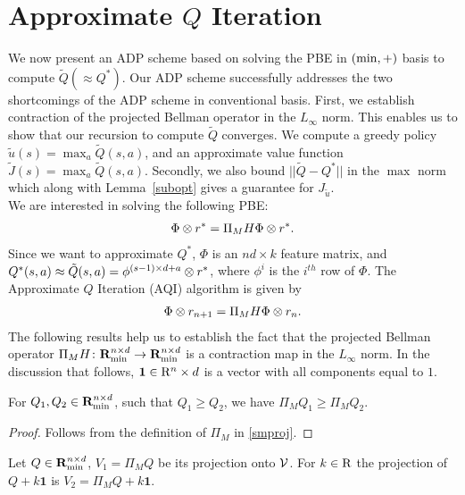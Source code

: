 \section{ Approximate $Q$ Iteration}\label{adpminp}
We now present an ADP scheme based on solving the PBE in $(\min,+)$ basis to compute $\tilde{Q}(\approx Q^*)$. Our ADP scheme successfully addresses the two shortcomings of the ADP scheme in conventional basis. First, we establish contraction of the projected Bellman operator in the $L_\infty$ norm. This enables us to show that our recursion to compute $\tilde{Q}$ converges. We compute a greedy policy $\tilde{u}(s)=\max_a\tilde{Q}(s,a)$, and an approximate value function $\tilde{J}(s)=\max_a\tilde{Q}(s,a)$. Secondly, we also bound $||\tilde{Q}-Q^*||$ in the $\max$ norm which along with Lemma~\ref{subopt} gives a guarantee for $J_{\tilde{u}}$.\\
We are interested in solving the following PBE:%
\begin{align}\label{qpbe}
\Phi \otimes r^*=\Pi_M H \Phi \otimes r^*.
\end{align}
Since we want to approximate $Q^*$, $\Phi$ is an $nd\times k$ feature matrix, and $Q^*(s,a)\approx\tilde{Q}(s,a)=\phi^{(s-1)\times d+a}\otimes r^*$, where $\phi^i$ is the $i^{th}$ row of $\Phi$.
The Approximate $Q$ Iteration (AQI) algorithm is given by
\begin{align}\label{projqiter}
\Phi \otimes r_{n+1}=\Pi_M H \Phi \otimes r_n.
\end{align}
The following results help us to establish the fact that the projected Bellman operator $\Pi_M H\colon \mathbf{R}_{\min}^{n\times d}\rightarrow \mathbf{R}_{\min}^{n\times d}$ is a contraction map in the $L_\infty$ norm. In the discussion that follows, $\mathbf{1} \in \mathrm{R}^n\times d$ is a vector with all components equal to $1$.
\begin{lemma}\label{monotone}
For $Q_1, Q_2 \in \mathbf{R}_{\min}^{n\times d}$, such that $Q_1\geq Q_2$, we have $\Pi_M Q_1\geq \Pi_M Q_2$.
\end{lemma}
\begin{proof}
Follows from the definition of $\Pi_M$ in \eqref{smproj}.
\end{proof}
\begin{lemma}\label{shift}
Let $Q\in \mathbf{R}_{\min}^{n\times d}$, $V_1=\Pi_M Q$ be its projection onto $\mathcal{V}$. For $k\in \mathrm{R}$ the projection of $Q+k\mathbf{1}$ is $V_2=\Pi_M Q+k\mathbf{1}$.
\end{lemma}
